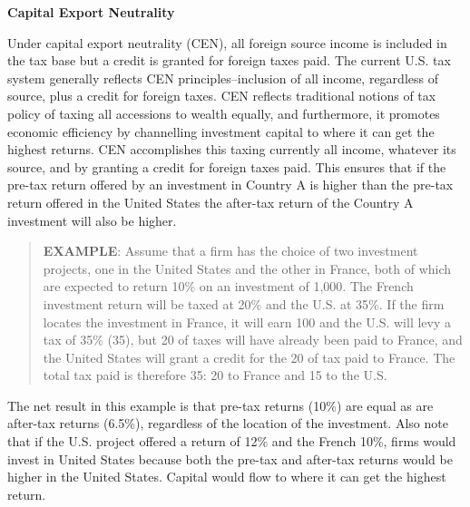 			\begin{center}	
				\textbf{Capital Export Neutrality}
					\end{center}
					
Under capital export neutrality (CEN), all foreign source income is included in the tax base but a credit is granted for foreign taxes paid.  The current U.S. tax system generally reflects CEN principles--inclusion of all income, regardless of source, plus a credit for foreign taxes.  CEN reflects traditional notions of tax policy of taxing all accessions to wealth equally, and furthermore, it promotes economic efficiency by channelling investment capital to where it can get the highest returns.  CEN accomplishes this taxing currently all income, whatever its source, and by granting a credit for foreign taxes paid.  This ensures that if the pre-tax return offered by an investment in Country A is higher than the pre-tax return offered in the United States the after-tax return of the Country A investment will also be higher.  

\begin{quote}
 \textbf{EXAMPLE}:  Assume that a firm has the choice of two investment projects, one in the United States and the other in France, both of which are expected to return 10\% on an investment of 1,000.  The French investment return will be taxed at 20\% and the U.S. at 35\%.  If the firm locates the investment in France, it will earn 100 and the U.S. will levy a tax of 35\% (35), but 20 of taxes will have already been paid to France, and the United States will grant a credit for the 20 of tax paid to France.  The total tax paid is therefore 35:  20 to France and 15 to the U.S.          
\end{quote}

The net result in this example is that pre-tax returns (10\%) are equal as are after-tax returns (6.5\%), regardless of the location of the investment.  Also note that if the U.S. project offered a return of 12\% and the French 10\%, firms would invest in United States because both the pre-tax and after-tax returns would be higher in the United States.  Capital would flow to where it can get the highest return.   

